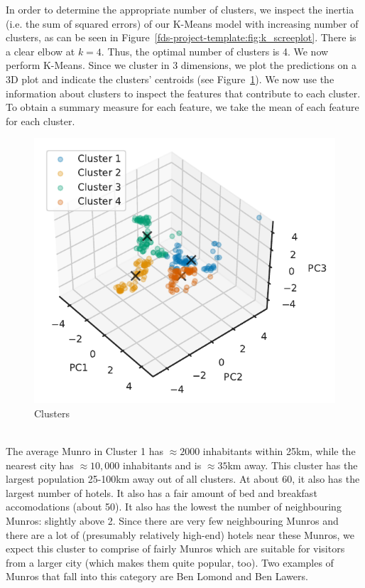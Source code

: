 \documentclass[11pt,a4paper]{article}
\begin{document}
In order to determine the appropriate number of clusters, we inspect the inertia (i.e. the sum of squared errors) of our K-Means model with increasing number of clusters, as can be seen in Figure~\ref{fds-project-template:fig:k_screeplot}. There is a clear elbow at $k = 4$. Thus, the optimal number of clusters is 4. We now perform K-Means. Since we cluster in 3 dimensions, we plot the predictions on a 3D plot and indicate the clusters' centroids (see Figure~\ref{fds-project-template:fig:3d_clusters}). We now use the information about clusters to inspect the features that contribute to each cluster. To obtain a summary measure for each feature, we take the mean of each feature for each cluster.
\begin{figure} [h!]
  \centering
  \includegraphics{report/3d_clusters.pdf}
  \caption{Clusters}
  \label{fds-project-template:fig:3d_clusters}
\end{figure} \\
The average Munro in Cluster 1 has $\approx 2000$ inhabitants within 25km, while the nearest city has $\approx 10,000$ inhabitants and is $\approx 35$km away. This cluster has the largest population 25-100km away out of all clusters. At about 60, it also has the largest number of hotels. It also has a fair amount of bed and breakfast accomodations (about 50). It also has the lowest the number of neighbouring Munros: slightly above 2. Since there are very few neighbouring Munros and there are a lot of (presumably relatively high-end) hotels near these Munros, we expect this cluster to comprise of fairly  Munros which are suitable for visitors from a larger city (which makes them quite popular, too). Two examples of Munros that fall into this category are Ben Lomond and Ben Lawers.
\end{document}
